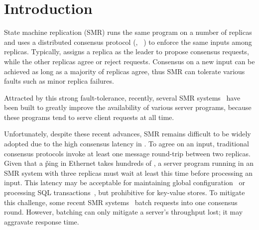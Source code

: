 \section{Introduction} \label{sec:intro}

State machine replication (SMR) runs the same program on a 
number of replicas and uses a distributed consensus protocol (\eg, 
\paxos~\cite{crane:sosp15}) to enforce the same inputs among 
replicas. Typically, \paxos assigns a replica as the leader to propose 
consensus requests, while the other replicas agree or reject requests. 
Consensus on a new input can be achieved as long as a majority of replicas 
agree, thus SMR can tolerate various faults such as minor replica 
failures.

Attracted by this strong fault-tolerance, recently, several SMR 
systems~\cite{chubby:osdi, zookeeper, crane:sosp15, eve:osdi12, rex:eurosys14} 
have been built to greatly improve the availability of various server programs, 
because these programs tend to serve client requests at all time.

Unfortunately, despite these recent advances, SMR remains difficult to be 
widely adopted due to the high consensus latency in \paxos. To agree on an 
input, traditional consensus protocols invoke at least one message round-trip 
between two replicas. Given that a \v{ping} in Ethernet takes hundreds of \us, a 
server program running in an SMR system with three replicas must wait at 
least this time before processing an input. This latency may be acceptable for 
maintaining global configuration~\cite{chubby:osdi,zookeeper} or processing SQL 
transactions~\cite{crane:sosp15,eve:osdi12}, but prohibitive for 
key-value stores. To mitigate this challenge, some recent SMR 
systems~\cite{calvin:sigmod12,rex:eurosys14} batch requests into one 
consensus round. However, batching can only mitigate a server's throughput 
lost; it may aggravate response time. 

